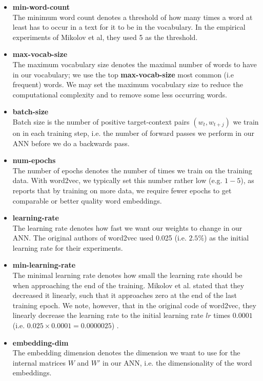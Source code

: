 \begin{itemize}
    \item \textbf{min-word-count} \\
        The minimum word count denotes a threshold of how many times a word at least has to occur in a text for it to be in the vocabulary. In the empirical experiments of Mikolov et al, they used 5 as the threshold.
    \item \textbf{max-vocab-size} \\
        The maximum vocabulary size denotes the maximal number of words to have in our vocabulary; we use the top \textbf{max-vocab-size} most common (i.e frequent) words. We may set the maximum vocabulary size to reduce the computational complexity and to remove some less occurring words.
    \item \textbf{batch-size} \\
        Batch size is the number of positive target-context pairs $(w_t, w_{t+j})$ we train on in each training step, i.e. the number of forward passes we perform in our ANN before we do a backwards pass.
    \item \textbf{num-epochs} \\
        The number of epochs denotes the number of times we train on the training data. With word2vec, we typically set this number rather low (e.g. $1-5$), as \cites{mikolov2013a} reports that by training on more data, we require fewer epochs to get comparable or better quality word embeddings.
    \item \textbf{learning-rate} \\
        The learning rate denotes how fast we want our weights to change in our ANN. The original authors of word2vec used 0.025 (i.e. $2.5\%$) as the initial learning rate for their experiments.
    \item \textbf{min-learning-rate} \\
        The minimal learning rate denotes how small the learning rate should be when approaching the end of the training. Mikolov et al. stated that they decreased it linearly, such that it approaches zero at the end of the last training epoch. We note, however, that in the original code of word2vec, they linearly decrease the learning rate to the initial learning rate $lr$ times $0.0001$ (i.e. $0.025 \times 0.0001 = 0.0000025$) \cite[line 398]{Word2vecCCode}.
    \item \textbf{embedding-dim} \\
        The embedding dimension denotes the dimension we want to use for the internal matrices $W$ and $W'$ in our ANN, i.e. the dimensionality of the word embeddings.

\end{itemize}

